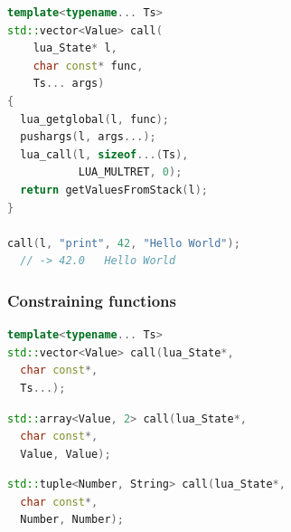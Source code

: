 \documentclass{beamer}
\newif\iftransitions
\begin{document}
\begin{frame}[fragile]
  \begin{semiverbatim}

  \end{semiverbatim}
  \else
  \begin{lstlisting}[language={C++}]
template<typename... Ts>
std::vector<Value> call(
    lua_State* l,
    char const* func,
    Ts... args)
{
  lua_getglobal(l, func);
  pushargs(l, args...);
  lua_call(l, sizeof...(Ts),
           LUA_MULTRET, 0);
  return getValuesFromStack(l);  
}

call(l, "print", 42, "Hello World");
  // -> 42.0   Hello World
  \end{lstlisting}
  \fi
\end{frame}


\begin{frame}[fragile]
  \frametitle{Constraining functions}

  \begin{lstlisting}[language={C++}]
template<typename... Ts>
std::vector<Value> call(lua_State*,
  char const*,
  Ts...);
  \end{lstlisting}
  \iftransitions \pause \fi
  \begin{lstlisting}[language={C++}]
std::array<Value, 2> call(lua_State*,
  char const*,
  Value, Value);
  \end{lstlisting}
  \iftransitions \pause \fi
  \begin{lstlisting}[language={C++}]
std::tuple<Number, String> call(lua_State*,
  char const*,
  Number, Number);
  \end{lstlisting}
    
\end{frame}
\end{document}

